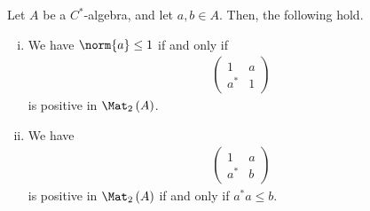 \documentclass[10pt]{mypackage}
\begin{document}
\begin{lemma}
  Let $A$ be a $C^{\ast}$-algebra, and let $a,b\in A$. Then, the following hold.
  \begin{enumerate}[(i)]
    \item We have $\norm{a}\leq 1$ if and only if
      \begin{align*}
        \begin{pmatrix}1 & a \\ a^{\ast} & 1\end{pmatrix}
      \end{align*}
      is positive in $\Mat_2\left( A \right)$.
    \item We have
      \begin{align*}
        \begin{pmatrix}1 & a \\ a^{\ast} & b\end{pmatrix}
      \end{align*}
      is positive in $\Mat_2\left( A \right)$ if and only if $a^{\ast}a \leq b$.
  \end{enumerate}
\end{lemma}
\end{document}
